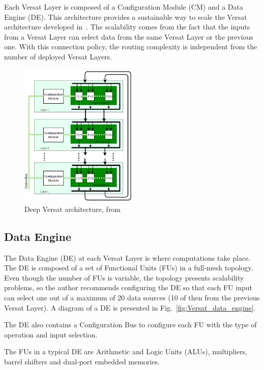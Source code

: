 Each Versat Layer is composed of a Configuration Module (CM) and a Data Engine
(DE). This architecture provides a sustainable way to scale the Versat
architecture developed in~\cite{JDLopes:Thesis_Versat}. The scalability comes
from the fact that the inputs from a Versat Layer can select data from the same
Versat Layer or the previous one. With this connection policy, the routing
complexity is independent from the number of deployed Versat Layers.

\begin{figure}[!htb]
	\centering
	\includegraphics[width=0.5\textwidth]{Figures/deep_versat_arch.png}
	\caption[Caption for figure in TOC.]{Deep Versat architecture, from~\cite{VMario:Deep_Versat}}
	\label{fig:DeepVersat_architecture}
\end{figure}

\subsection{Data Engine}
\label{sec:versat_data_engine}
The Data Engine (DE) at each Versat Layer is where computations take place. The
DE is composed of a set of Functional Units (FUs) in a full-mesh topology. Even
though the number of FUs is variable, the topology presents scalability
problems, so the author recommends configuring the DE so that each FU input can
select one out of a maximum of 20 data sources (10 of then from the previous
Versat Layer). A diagram of a DE is presented in
Fig.~\ref{fig:Versat_data_engine}.

The DE also contains a Configuration Bus to configure each FU with the type
of operation and input selection.

The FUs in a typical DE are Arithmetic and Logic Units (ALUs), multipliers,
barrel shifters and dual-port embedded memories.


